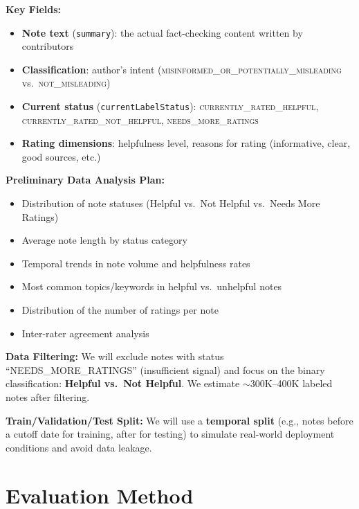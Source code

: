 \documentclass[12pt, a4paper]{article}
\begin{document}
\noindent\textbf{Key Fields:}
\begin{itemize}[nosep]
    \item \textbf{Note text} (\texttt{summary}): the actual fact-checking content written by contributors
    \item \textbf{Classification}: author's intent (\textsc{misinformed\_or\_potentially\_misleading} vs.\ \textsc{not\_misleading})
    \item \textbf{Current status} (\texttt{currentLabelStatus}): \textsc{currently\_rated\_helpful}, \textsc{currently\_rated\_not\_helpful}, \textsc{needs\_more\_ratings}
    \item \textbf{Rating dimensions}: helpfulness level, reasons for rating (informative, clear, good sources, etc.)
\end{itemize}

\medskip
\noindent\textbf{Preliminary Data Analysis Plan:}
\begin{itemize}[nosep]
    \item Distribution of note statuses (Helpful vs.\ Not Helpful vs.\ Needs More Ratings)
    \item Average note length by status category
    \item Temporal trends in note volume and helpfulness rates
    \item Most common topics/keywords in helpful vs.\ unhelpful notes
    \item Distribution of the number of ratings per note
    \item Inter-rater agreement analysis
\end{itemize}

\medskip
\noindent\textbf{Data Filtering:} We will exclude notes with status ``NEEDS\_MORE\_RATINGS'' (insufficient signal) and focus on the binary classification: \textbf{Helpful vs.\ Not Helpful}. We estimate $\sim$300K--400K labeled notes after filtering.

\medskip
\noindent\textbf{Train/Validation/Test Split:} We will use a \textbf{temporal split} (e.g., notes before a cutoff date for training, after for testing) to simulate real-world deployment conditions and avoid data leakage.

\section{Evaluation Method}
\end{document}
